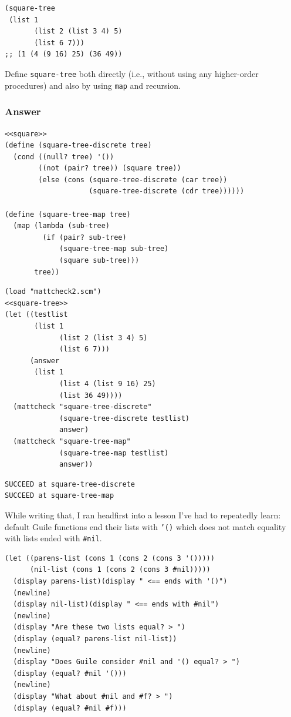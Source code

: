 \documentclass[final,fleqn,titlepage,twoside]{article}
\begin{document}
\begin{verbatim}
(square-tree
 (list 1
       (list 2 (list 3 4) 5)
       (list 6 7)))
;; (1 (4 (9 16) 25) (36 49))
\end{verbatim}

Define \texttt{square-tree} both directly (i.e., without using any higher-order
procedures) and also by using \texttt{map} and recursion.

\subsubsection{Answer}
\label{sec:orgc75841b}
\begin{verbatim}
<<square>>
(define (square-tree-discrete tree)
  (cond ((null? tree) '())
        ((not (pair? tree)) (square tree))
        (else (cons (square-tree-discrete (car tree))
                    (square-tree-discrete (cdr tree))))))

(define (square-tree-map tree)
  (map (lambda (sub-tree)
         (if (pair? sub-tree)
             (square-tree-map sub-tree)
             (square sub-tree)))
       tree))
\end{verbatim}

\begin{verbatim}
(load "mattcheck2.scm")
<<square-tree>>
(let ((testlist
       (list 1
             (list 2 (list 3 4) 5)
             (list 6 7)))
      (answer
       (list 1
             (list 4 (list 9 16) 25)
             (list 36 49))))
  (mattcheck "square-tree-discrete"
             (square-tree-discrete testlist)
             answer)
  (mattcheck "square-tree-map"
             (square-tree-map testlist)
             answer))
\end{verbatim}

\begin{verbatim}
SUCCEED at square-tree-discrete
SUCCEED at square-tree-map
\end{verbatim}

While writing that, I ran headfirst into a lesson I've had to repeatedly learn: default Guile functions end their lists with \texttt{'()} which does not match equality with lists ended with \texttt{#nil}.
\begin{verbatim}
(let ((parens-list (cons 1 (cons 2 (cons 3 '()))))
      (nil-list (cons 1 (cons 2 (cons 3 #nil)))))
  (display parens-list)(display " <== ends with '()")
  (newline)
  (display nil-list)(display " <== ends with #nil")
  (newline)
  (display "Are these two lists equal? > ")
  (display (equal? parens-list nil-list))
  (newline)
  (display "Does Guile consider #nil and '() equal? > ")
  (display (equal? #nil '()))
  (newline)
  (display "What about #nil and #f? > ")
  (display (equal? #nil #f)))
\end{verbatim}
\end{document}
